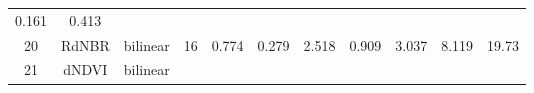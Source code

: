 \documentclass[twoside,12pt,final]{ucthesis-CA2012}
\begin{document}
\begin{ucmainmatter}
\begin{longtable}[]{@{}ccccccccccc@{}}
\begin{minipage}[t]{0.05\columnwidth}
0.161\strut
\end{minipage} & \begin{minipage}[t]{0.05\columnwidth}\centering\strut
0.413\strut
\end{minipage}\tabularnewline
\begin{minipage}[t]{0.04\columnwidth}\centering\strut
20\strut
\end{minipage} & \begin{minipage}[t]{0.11\columnwidth}\centering\strut
RdNBR\strut
\end{minipage} & \begin{minipage}[t]{0.06\columnwidth}\centering\strut
bilinear\strut
\end{minipage} & \begin{minipage}[t]{0.08\columnwidth}\centering\strut
16\strut
\end{minipage} & \begin{minipage}[t]{0.08\columnwidth}\centering\strut
0.774\strut
\end{minipage} & \begin{minipage}[t]{0.07\columnwidth}\centering\strut
0.279\strut
\end{minipage} & \begin{minipage}[t]{0.07\columnwidth}\centering\strut
2.518\strut
\end{minipage} & \begin{minipage}[t]{0.07\columnwidth}\centering\strut
0.909\strut
\end{minipage} & \begin{minipage}[t]{0.05\columnwidth}\centering\strut
3.037\strut
\end{minipage} & \begin{minipage}[t]{0.05\columnwidth}\centering\strut
8.119\strut
\end{minipage} & \begin{minipage}[t]{0.05\columnwidth}\centering\strut
19.73\strut
\end{minipage}\tabularnewline
\begin{minipage}[t]{0.04\columnwidth}\centering\strut
21\strut
\end{minipage} & \begin{minipage}[t]{0.11\columnwidth}\centering\strut
dNDVI\strut
\end{minipage} & \begin{minipage}[t]{0.06\columnwidth}\centering\strut
bilinear\strut
\end{minipage} & \begin{minipage}[t]{0.08\columnwidth}\centering\strut

\end{minipage}
\end{longtable}
\end{ucmainmatter}
\end{document}
